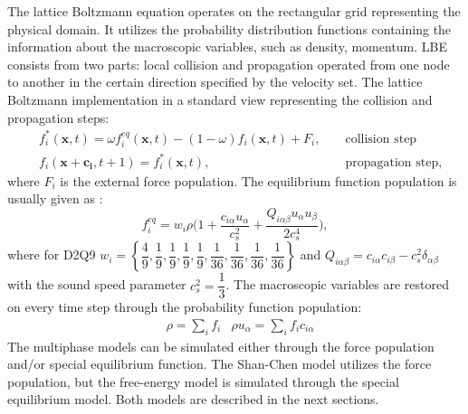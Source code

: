 \documentclass[mathpazo]{cicp}
\begin{document}
The lattice Boltzmann equation operates on the rectangular grid representing the physical domain. It utilizes the
probability distribution functions containing the information about the macroscopic variables, such as density,
momentum. LBE consists from two parts: local collision and propagation operated from one node to another in the certain
direction specified by the velocity set.  The lattice Boltzmann implementation in a standard view representing the
collision and propagation steps:
\begin{equation}
\label{standard:implementation}
\begin{aligned}
&f_i^{*}(\bm{x},t)=\omega f_i^{eq}(\bm{x},t)-(1-\omega) f_i(\bm{x},t) + F_i,&&\text{ collision step}\\
&f_i(\bm{x}+\bm{c_i},t+1)=f_i^{*}(\bm{x},t),&&\text{ propagation step}, 
\end{aligned}
\end{equation}
where $F_i$ is the external force population. The equilibrium function population is usually given as \cite{}:
\begin{equation}
f_i^{eq}=w_i \rho \biggl(1+\frac{c_{i\alpha}u_{\alpha}}{c_s^2}+\frac{Q_{i\alpha\beta}u_{\alpha}u_{\beta}}{2 c_s^4}\biggr),
\end{equation}
where for D2Q9
$w_i=\left\{\dfrac{4}{9},\dfrac{1}{9},\dfrac{1}{9},\dfrac{1}{9},\dfrac{1}{9},\dfrac{1}{36},\dfrac{1}{36},\dfrac{1}{36},\dfrac{1}{36}\right\}$
and $Q_{i\alpha\beta}=c_{i\alpha} c_{i\beta} - c_s^2 \delta_{\alpha\beta}$ with the sound speed parameter $c_s^2=\dfrac{1}{3}$. The macroscopic variables are restored on
every time step through the probability function population:
\begin{equation*}
\begin{aligned}
&\rho=\sum_i{f_i}
&\rho u_{\alpha}=\sum_i{f_i c_{i\alpha}}
\end{aligned}
\end{equation*}
The multiphase models can be simulated either through the force population and/or special equilibrium function. The
Shan-Chen model utilizes the force population, but the free-energy model is simulated through the special equilibrium
model. Both models are described in the next sections.
\end{document}
